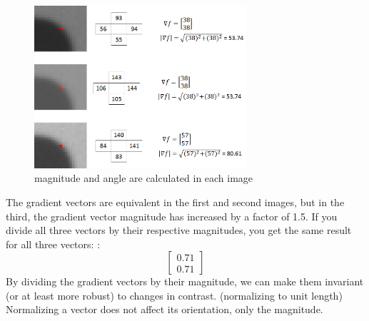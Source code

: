\begin{figure}
	\centering
	\includegraphics[width=0.70\textwidth]{normalization_calc.png}
	\caption{magnitude and angle are calculated in each image}
	\label{fig:normalization calc}
\end{figure}
\newline
The gradient vectors are equivalent in the first and second images, but in the third, the gradient vector magnitude has increased by a factor of 1.5. \newline
If you divide all three vectors by their respective magnitudes, you get the same result for all three vectors:
:\[ \begin{bmatrix}
0.71\\0.71
\end{bmatrix} \]
\newline
\newline
By dividing the gradient vectors by their magnitude, we can make them invariant (or at least more robust) to changes in contrast. (normalizing to unit length)
\newline Normalizing a vector does not affect its orientation, only the magnitude.
